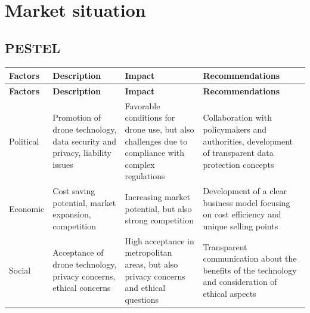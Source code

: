 \chapter{Market situation} \label{market-situation}
\section{PESTEL}
\begin{longtable}{p{} p{} p{} p{}}
  \textbf{Factors} & \textbf{Description}                                                                                                         & \textbf{Impact}                                                                                    & \textbf{Recommendations}                                                                                          \\ \hline
  \endfirsthead %

  \textbf{Factors} & \textbf{Description}                                                                                                         & \textbf{Impact}                                                                                    & \textbf{Recommendations}                                                                                          \\ \hline
  \endhead %

  Political        & Promotion of drone technology, data security and privacy, liability issues                                                   & Favorable conditions for drone use, but also challenges due to compliance with complex regulations & Collaboration with policymakers and authorities, development of transparent data protection concepts              \\ \hline

  Economic         & Cost saving potential, market expansion, competition                                                                         & Increasing market potential, but also strong competition                                           & Development of a clear business model focusing on cost efficiency and unique selling points                       \\ \hline

  Social           & Acceptance of drone technology, privacy concerns, ethical concerns                                                           & High acceptance in metropolitan areas, but also privacy concerns and ethical questions             & Transparent communication about the benefits of the technology and consideration of ethical aspects               \\ \hline


\end{longtable}
